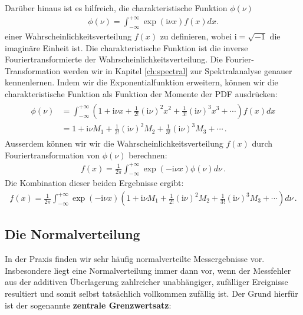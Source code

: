 Darüber hinaus ist es hilfreich, die charakteristische Funktion $\phi(\nu)$
\begin{align}
\phi(\nu) = \int_{-\infty}^{+\infty} \exp ( \mathrm{i} \nu x) f ( x ) dx.
\label{eq:charakteristischefunktion}
\end{align}
 einer Wahrscheinlichkeitsverteilung $f(x)$ zu definieren, wobei $\mathrm{i}=\sqrt{-1}$ die imaginäre Einheit ist. Die charakteristische Funktion ist die inverse Fouriertransformierte der Wahrscheinlichkeitsverteilung. Die Fourier-Transformation werden wir in Kapitel \ref{ch:spectral} zur Spektralanalyse genauer kennenlernen.  Indem wir die Exponentialfunktion erweitern, können wir die charakteristische Funktion als Funktion der Momente der PDF ausdrücken:
\begin{align}
\begin{split}
\phi ( \nu ) & = \int_{-\infty}^{+\infty} \left( 1 + \mathrm{i} \nu x + \frac{ 1 }{ 2! } ( \mathrm{i} \nu )^2 x^2 + \frac{ 1 }{ 3! } ( \mathrm{i} \nu )^3 x^3 + \cdots \right) f ( x ) dx\\
& = 1 + \mathrm{i} \nu M_1 + \frac{ 1 }{ 2 ! } ( \mathrm{i} \nu )^2 M_2 + \frac{ 1 }{ 3! } ( \mathrm{i} \nu )^3 M_3 + \cdots\,.
\end{split}
\end{align}
Ausserdem können wir wir die Wahrscheinlichkeitsverteilung $f(x)$ durch Fouriertransformation von $\phi(\nu)$ berechnen:
\begin{align}
f ( x ) = \frac{ 1 }{ 2 \pi } \int_{-\infty}^{+\infty} \exp ( -\mathrm{i} \nu x ) \phi ( \nu ) d \nu\,.
\end{align}
Die Kombination dieser beiden Ergebnisse ergibt:
\begin{align}
f ( x ) = \frac{ 1 }{ 2 \pi } \int_{-\infty}^{+\infty} \exp ( -\mathrm{i} \nu x ) \left( 1 + \mathrm{i} \nu M_1 + \frac{ 1 }{ 2 ! } ( \mathrm{i} \nu )^2 M_2 + \frac{ 1 }{ 3! } ( \mathrm{i} \nu )^3 M_3 + \cdots \right)  d \nu\,.
\end{align}

\subsection{Die Normalverteilung}

In der Praxis finden wir sehr häufig normalverteilte Messergebnisse vor. Insbesondere liegt eine Normalverteilung immer dann vor, wenn der Messfehler  aus der additiven Überlagerung zahlreicher unabhängiger, zufälliger Ereignisse resultiert und somit selbst tatsächlich vollkommen zufällig ist.  Der Grund hierfür ist der sogenannte \textbf{zentrale Grenzwertsatz}:\\

